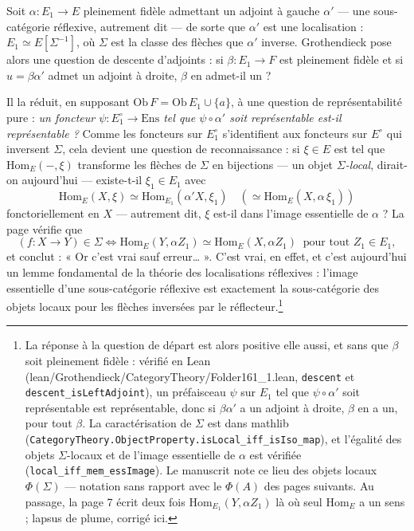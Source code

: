 \documentclass[11pt,a4paper]{article}
\begin{document}
Soit $\alpha : E_1 \to E$ pleinement fidèle admettant un adjoint à gauche
$\alpha'$ — une sous-catégorie réflexive, autrement dit — de sorte que
$\alpha'$ est une localisation : $E_1 \simeq E[\Sigma^{-1}]$, où $\Sigma$
est la classe des flèches que $\alpha'$ inverse. Grothendieck pose alors
une question de descente d'adjoints : si $\beta : E_1 \to F$ est pleinement
fidèle et si $u = \beta\alpha'$ admet un adjoint à droite, $\beta$
en admet-il un ?

Il la réduit, en supposant $\mathrm{Ob}\,F = \mathrm{Ob}\,E_1 \cup \{a\}$,
à une question de représentabilité pure : \emph{un foncteur
$\psi : E_1^{\circ} \to \mathrm{Ens}$ tel que $\psi \circ \alpha'$ soit
représentable est-il représentable ?} Comme les foncteurs sur
$E_1^{\circ}$ s'identifient aux foncteurs sur $E^{\circ}$ qui inversent
$\Sigma$, cela devient une question de reconnaissance : si
$\xi \in E$ est tel que $\mathrm{Hom}_E(-, \xi)$ transforme les flèches de
$\Sigma$ en bijections — un objet \emph{$\Sigma$-local}, dirait-on
aujourd'hui — existe-t-il $\xi_1 \in E_1$ avec
\[
\mathrm{Hom}_E(X, \xi) \simeq \mathrm{Hom}_{E_1}(\alpha' X, \xi_1)
\quad (\simeq \mathrm{Hom}_E(X, \alpha\,\xi_1))
\]
fonctoriellement en $X$ — autrement dit, $\xi$ est-il dans l'image
essentielle de $\alpha$ ? La page vérifie que
\[
(f : X \to Y) \in \Sigma \iff
\mathrm{Hom}_E(Y, \alpha Z_1) \simeq \mathrm{Hom}_E(X, \alpha Z_1)
\ \text{ pour tout } Z_1 \in E_1,
\]
et conclut : « Or c'est vrai sauf erreur… ». C'est vrai, en effet, et c'est
aujourd'hui un lemme fondamental de la théorie des localisations
réflexives : l'image essentielle d'une sous-catégorie réflexive est
exactement la sous-catégorie des objets locaux pour les flèches inversées
par le réflecteur.\footnote{La réponse à la question de départ est alors
positive elle aussi, et sans que $\beta$ soit pleinement fidèle : vérifié en
Lean (lean/Grothendieck/CategoryTheory/Folder161\_1.lean, \texttt{descent} et
\texttt{descent\_isLeftAdjoint}), un préfaisceau $\psi$ sur $E_1$ tel que
$\psi \circ \alpha'$ soit représentable est représentable, donc si
$\beta\alpha'$ a un adjoint à droite, $\beta$ en a un, pour tout $\beta$.
La caractérisation de $\Sigma$ est dans mathlib
(\texttt{CategoryTheory.ObjectProperty.isLocal\_iff\_isIso\_map}), et
l'égalité des objets $\Sigma$-locaux et de l'image essentielle de $\alpha$ est
vérifiée (\texttt{local\_iff\_mem\_essImage}). Le manuscrit note ce lieu des objets locaux
$\Phi(\Sigma)$ — notation sans rapport avec le $\Phi(A)$ des pages
suivants. Au passage, la page 7 écrit deux fois
$\mathrm{Hom}_{E_1}(Y, \alpha Z_1)$ là où seul $\mathrm{Hom}_E$ a un sens ;
lapsus de plume, corrigé ici.}
\end{document}
